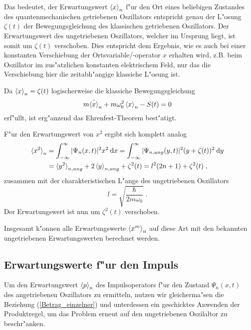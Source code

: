     Das bedeutet, der Erwartungswert $\braket{x}_n$ f"ur den Ort eines beliebigen Zustandes des quantenmechanischen getriebenen Oszillators entspricht genau der L"osung $\zeta(t)$ der Bewegungsgleichung des klassischen getriebenen Oszillators.
    Der Erwartungswert des ungetriebenen Oszillators, welcher im Ursprung liegt, ist somit um $\zeta(t)$ verschoben.
    Dies entspricht dem Ergebnis, wie es auch bei einer konstanten Verschiebung der Ortsvariable/-operator $x$ erhalten wird, z.B. beim Oszillator im zus"atzlichen konstanten elektrischem Feld, nur das die Verschiebung hier die zeitabh"angige klassiche L"osung ist.

    Da $\braket{x}_n=\zeta(t)$ logischerweise die klassiche Bewegungsgleichung
    \begin{equation}
      m\ddot{\braket{x}}_n + m\omega_0^2\braket{x}_n - S(t) = 0
    \end{equation}
    erf"ullt, ist erg"anzend das Ehrenfest-Theorem best"atigt.

    F"ur den Erwartungswert von $x^2$ ergibt sich komplett analog
    \begin{align}
      \braket{x^2}_n &= \int_{-\infty}^{\infty} |\Psi_n(x,t)|^2 x^2 \: \text dx
      = \int_{-\infty}^{\infty} |\Psi_{n,ung}(y,t)|^2 (y+\zeta(t))^2 \: \text dy \notag \\
      &= \braket{y^2}_{n,ung} + 2\braket{y}_{n,ung} + \zeta^2(t)
      = l^2(2n+1) + \zeta^2(t) \; ,
    \end{align}
    zusammen mit der charakteristischen L"ange des ungetriebenen Oszillators
    \begin{equation}
      l = \sqrt{\frac{\hbar}{2m\omega_0}} \; .
    \end{equation}
    Der Erwartungswert ist nun um $\zeta^2(t)$ verschoben.

    Insgesamt k"onnen alle Erwartungswerte $\braket{x^m}_n$ auf diese Art mit den bekannten ungetriebenen Erwartungswerten berechnet werden.




  \subsection{Erwartungswerte f"ur den Impuls}
    Um den Erwartungswert $\braket{p}_n$ des Impulsoperators f"ur den Zustand $\Psi_n(x,t)$ des angetriebenen Oszillators zu ermitteln, nutzen wir gleicherma"sen die Beziehung (\ref{Betrag_einzelner}) und unterdessen ein geschicktes Anwenden der Produktregel, um das Problem erneut auf den ungetriebenen Oszilaltor zu beschr"anken.

